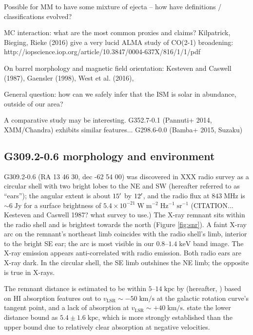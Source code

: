 \documentclass[twocolumn,tighten,trackchanges]{aastex6}
\newcommand*{\mt}{\mathrm}
\newcommand*{\unit}[1]{\;\mt{#1}}  %
\newcommand*{\abt}{\mathord{\sim}} %
\begin{document}
Possible for MM to have some mixture of ejecta -- how have definitions /
classifications evolved?

MC interaction: what are the most common proxies and
claims?
Kilpatrick, Bieging, Rieke (2016) give a very lucid ALMA study of CO(2-1)
broadening: http://iopscience.iop.org/article/10.3847/0004-637X/816/1/1/pdf

On barrel morphology and magnetic field orientation: Kesteven and Caswell (1987),
Gaensler (1998), West et al. (2016),

General question: how can we safely infer that the ISM is solar in abundance,
outside of our area?

A comparative study may be interesting.
G352.7-0.1 (Pannuti+ 2014, XMM/Chandra) exhibits similar features...
G298.6-0.0 (Bamba+ 2015, Suzaku)


\subsection{G309.2-0.6 morphology and environment}

G309.2-0.6 (RA 13 46 30, dec -62 54 00) was discovered in XXX radio
survey \citep{someone} as a circular shell with two bright lobes to the NE and
SW (hereafter referred to as ``ears'');
the angular extent is about $15\mbox{$^\prime$}$ by $12\mbox{$^\prime$}$, and the radio flux at
$843 \unit{MHz}$ is $\abt 6 \unit{Jy}$ for a surface brightness of
$5.4\times10^{-21} \unit{W \; m^{-2} \; Hz^{-1} \; sr^{-1}}$
(CITATION... Kesteven and Caswell 1987? what survey to use.)
The X-ray remnant sits within the radio shell and is brightest towards the
north (Figure \ref{fig:snr}).
A faint X-ray arc on the remnant's northeast limb coincides with the radio
shell's limb, interior to the bright SE ear; the arc is most visible in our
$0.8$--$1.4 \unit{keV}$ band image.
The X-ray emission appears anti-correlated with radio emission.
Both radio ears are X-ray dark.
In the circular shell, the SE limb outshines the NE limb; the opposite is true
in X-rays.  %

The remnant distance is estimated to be within $5$--$14 \unit{kpc}$ by
\citet{gaensler98} (hereafter, \citet{GGM98}) based on HI absorption features
out to $v_{\mt{LSR}} \sim -50 \unit{km/s}$ at the galactic rotation curve's
tangent point, and a lack of absorption at $v_{\mt{LSR}} \sim +40 \unit{km/s}$.
\citet{GGM98} state the lower distance bound as $5.4 \pm 1.6 \unit{kpc}$, which
is more strongly established than the upper bound due to relatively clear
absorption at negative velocities.
\end{document}

